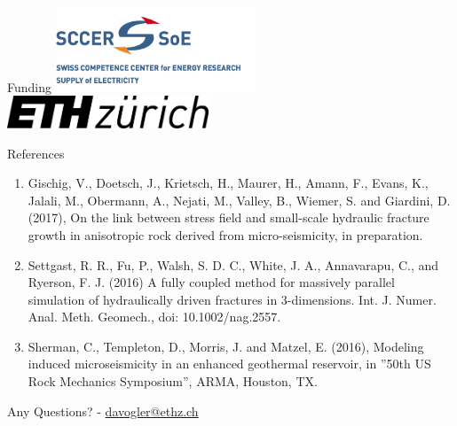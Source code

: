 \documentclass[first,firstsupp,svgnames,9pt]{ethz_beamer}
\begin{document}
\begin{frame}{Funding}
   \includegraphics[width=0.45\textwidth]{./sccer_logo}
   \hfill
   \includegraphics[width=0.45\textwidth]{./ethz_logo_black_transparent}
\end{frame}



\begin{frame}{References}
  \begin{enumerate}
    \item Gischig, V., Doetsch, J., Krietsch, H., Maurer, H., Amann, F., Evans, K., Jalali, M., Obermann, A., Nejati, M., Valley, B., Wiemer, S. and Giardini, D. (2017), On the link between stress field and small-scale hydraulic fracture growth in anisotropic rock derived from micro-seismicity, in preparation. \\[10pt]
    \item Settgast, R. R., Fu, P., Walsh, S. D. C., White, J. A., Annavarapu, C., and Ryerson, F. J. (2016) A fully coupled method for massively parallel simulation of hydraulically driven fractures in 3-dimensions. Int. J. Numer. Anal. Meth. Geomech., doi: 10.1002/nag.2557. \\[10pt]
    \item Sherman, C., Templeton, D., Morris, J. and Matzel, E. (2016), Modeling induced microseismicity in an enhanced geothermal reservoir, in ''50th US Rock Mechanics Symposium'', ARMA, Houston, TX.
  \end{enumerate}
\end{frame}



\begin{frame}
\begin{center}
\alert{\Huge{Any Questions?}}
\vskip 0.5cm
-
\vskip 0.5cm
\large{\url{davogler@ethz.ch} }
\end{center}
\end{frame}



\begin{frame}
  \Wider[3ex]{
  \maketitle
  \begin{center}
    \insertemail
  \end{center}
  }
\end{frame}
\end{document}
